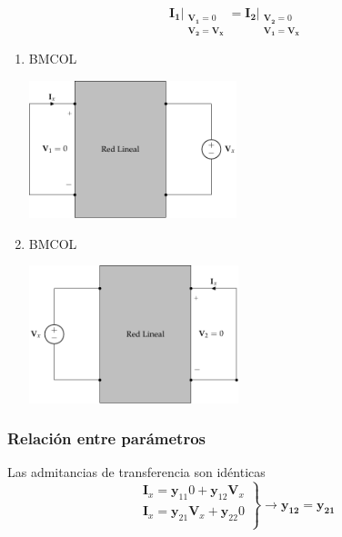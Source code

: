 \[
\mathbf{I_1}\rvert_{
  \begin{array}{l}
\mathbf{V_1} = 0 \\ \mathbf{V_2} = \mathbf{V_x}
  \end{array}
} =%
\mathbf{I_2}\rvert_{
  \begin{array}{l}
\mathbf{V_2} = 0 \\ \mathbf{V_1} = \mathbf{V_x}
  \end{array}
}
\]

\begin{enumerate}
\item \hfill{}\textsc{BMCOL}
\label{sec:orgbafb0fe}
\begin{center}
\includegraphics[height=4cm]{../figs/reciprocidadY_entrada.pdf}
\end{center}
\item \hfill{}\textsc{BMCOL}
\label{sec:orgb4d144b}
\begin{center}
\includegraphics[height=4cm]{../figs/reciprocidadY_salida.pdf}
\end{center}
\end{enumerate}
\subsubsection{Relación entre parámetros}
\label{sec:org5379fea}
Las admitancias de transferencia son idénticas
\[
  \left.
    \begin{array}{l}
      \mathbf{I}_x = \mathbf{y}_{11} 0  + \mathbf{y}_{12} \mathbf{V}_x\\
      \mathbf{I}_x = \mathbf{y}_{21} \mathbf{V}_x + \mathbf{y}_{22} 0\\
    \end{array} \right\} \rightarrow \boxed{\mathbf{y_{12}} = \mathbf{y_{21}}}
\]

